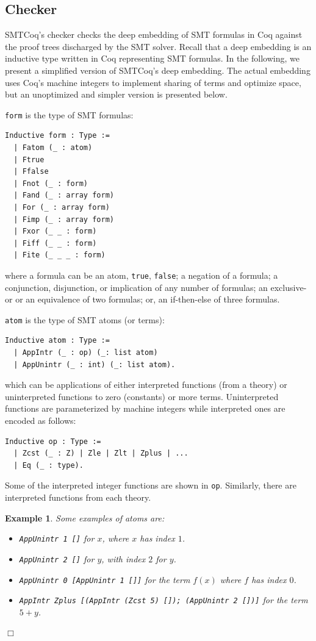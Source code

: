 \documentclass{article}
\newtheorem{example}{Example}[section]
\begin{document}
	\subsection{Checker}
	\label{sec:checker}
	SMTCoq's checker checks the deep embedding
	of SMT formulas in Coq against the 
	proof trees discharged by the SMT solver.
	Recall that a deep embedding is an
	inductive type written in 
	Coq representing SMT formulas. 
	In the following, we present 
	a simplified version of SMTCoq's 
	deep embedding. The actual embedding 
	uses Coq's machine integers to 
	implement sharing of terms and 
	optimize space, but an unoptimized 
	and simpler version is presented 
	below. 
	
	\medskip
	
	\noindent \texttt{form} is the type of 
	SMT formulas:
	\begin{verbatim}
Inductive form : Type :=
  | Fatom (_ : atom)
  | Ftrue
  | Ffalse
  | Fnot (_ : form)
  | Fand (_ : array form)
  | For (_ : array form)
  | Fimp (_ : array form)
  | Fxor (_ _ : form)
  | Fiff (_ _ : form)
  | Fite (_ _ _ : form)
	\end{verbatim}
	where a formula can be an atom, 
	\texttt{true}, \texttt{false};
	a negation of a formula; a 
	conjunction, disjunction, or 
	implication of any number of
	formulas; an exclusive-or or
	an equivalence of two formulas; 
	or, an if-then-else of three formulas.
	
	\medskip
	
	\noindent \texttt{atom} is the type of SMT atoms
	(or terms):
	\begin{verbatim}
Inductive atom : Type :=
  | AppIntr (_ : op) (_: list atom)
  | AppUnintr (_ : int) (_: list atom).	
	\end{verbatim} 
	which can be applications of 
	either interpreted functions 
	(from a theory) or uninterpreted
	functions to zero (constants) or more 
	terms. Uninterpreted functions 
	are parameterized by machine 
	integers while interpreted ones 
	are encoded as follows:
	\begin{verbatim}
Inductive op : Type :=
  | Zcst (_ : Z) | Zle | Zlt | Zplus | ...
  | Eq (_ : type).
	\end{verbatim}
	Some of the interpreted integer 
	functions are shown in \texttt{op}.
	Similarly, there are interpreted 
	functions from each theory.
	
	\begin{example}
		\label{ex:deepatoms}
		\em Some examples of atoms are:
		\begin{itemize}
			\item \texttt{AppUnintr	1 []} for $x$,
			where $x$ has index $1$.
			\item \texttt{AppUnintr 2 []} for $y$,
			with index $2$ for $y$.
			\item \texttt{AppUnintr 0 [AppUnintr 
				1 []]} for the term $f(x)$ where 
			$f$ has index $0$.
			\item \texttt{AppIntr Zplus [(AppIntr 
				(Zcst 5) []); (AppUnintr 2 [])]} 
			for the term $5 + y$.
		\end{itemize} \hfill $\Box$
	\end{example}
	
\end{document}
